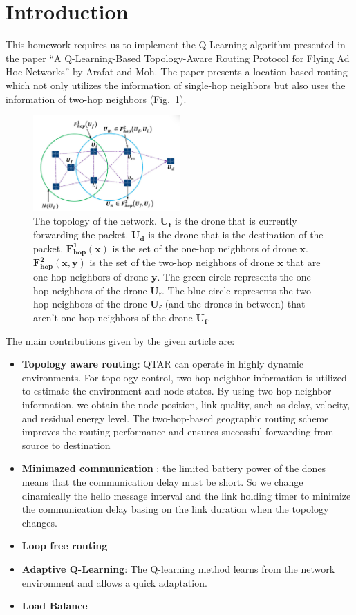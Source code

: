 \section{Introduction}
This homework requires us to implement the Q-Learning algorithm presented in
the paper ``A Q-Learning-Based Topology-Aware Routing Protocol for
Flying Ad Hoc Networks''  by Arafat and Moh.
The paper presents a location-based routing which not only utilizes
the information of single-hop neighbors but also uses the information
of two-hop neighbors (Fig.~\ref{fig:topology}).

\begin{figure}[h]
    \centering
    \includegraphics[width=0.5\textwidth]{Figures/paper-fig-6.png}
    \caption{
        The topology of the network.
        $\mathbf{U_f}$ is the drone that is currently forwarding the packet.
        $\mathbf{U_d}$ is the drone that is the destination of the packet.
        $\mathbf{F^1_{hop}(x)}$ is the set of the one-hop neighbors of drone $\mathbf{x}$.
        $\mathbf{F^2_{hop}(x, y)}$ is the set of the two-hop neighbors of drone $\mathbf{x}$ that are one-hop neighbors of drone $\mathbf{y}$.
        The green circle represents the one-hop neighbors of the drone $\mathbf{U_f}$.
        The blue circle represents the two-hop neighbors of the drone $\mathbf{U_f}$ (and the drones in between) that aren't one-hop neighbors of the drone $\mathbf{U_f}$.
    }\label{fig:topology}
\end{figure}
\newpage
The main contributions given by the given article are:
\begin{itemize}
    \item \textbf{Topology aware routing}: QTAR can operate in highly dynamic environments. For
    topology control, two-hop neighbor information is utilized to estimate the environment and node states. By
    using two-hop neighbor information, we obtain the node
    position, link quality, such as delay, velocity, and residual energy level. The two-hop-based geographic routing
    scheme improves the routing performance and ensures
    successful forwarding from source to destination
    \item \textbf{Minimazed communication }: the limited battery power of the dones means that the communication delay must be short. So we change dinamically the hello message interval and the link holding timer to minimize the communication delay basing on the link duration when the topology changes.
    \item \textbf{Loop free routing}
    \item \textbf{Adaptive Q-Learning}: The Q-learning method learns from
    the network environment and allows a quick adaptation.
    \item \textbf{Load Balance}
\end{itemize}